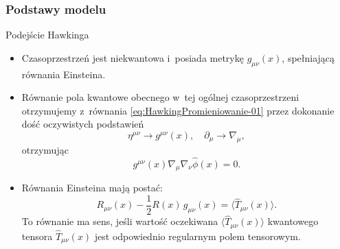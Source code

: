 \documentclass{beamer}  %
\begin{document}
\begin{frame}
  \frametitle{Podstawy modelu}

  \begin{block}{Podejście Hawkinga}
    \begin{itemize}
    \item Czasoprzestrzeń jest niekwantowa i~posiada metrykę
      $g_{ \mu \nu }( x )$, spełniającą równania Einsteina.
    \item Równanie pola kwantowe obecnego w~tej ogólnej
      czasoprzestrzeni otrzymujemy z~równania
      \eqref{eq:HawkingPromieniowanie-01} przez dokonanie dość
      oczywistych podstawień
      \begin{equation}
        \label{eq:HawkingPromieniowanie-02}
        \eta^{ \mu \nu } \to g^{ \mu \nu }( x ),
        \quad \partial_{ \mu } \to \nabla_{ \mu },
      \end{equation}
      otrzymując
      \begin{equation}
        \label{eq:HawkingPromieniowanie-03}
        g^{ \mu \nu }( x ) \nabla_{ \mu } \nabla_{ \nu }
        \widehat{ \phi }( x ) = 0.
      \end{equation}
    \item Równania Einsteina mają postać:
      \begin{equation}
        \label{eq:HawkingPromieniowanie-04}
        R_{ \mu \nu }( x ) - \frac{ 1 }{ 2 } R( x )\, g_{ \mu \nu }( x )
        = \langle \widehat{ T }_{ \mu \nu }( x ) \rangle.
      \end{equation}
      To równanie ma sens, jeśli wartość oczekiwana
      $\langle \widehat{ T }_{ \mu \nu }( x ) \rangle$ kwantowego
      tensora $\widehat{ T }_{ \mu \nu }( x )$ jest odpowiednio
      regularnym polem tensorowym.
    \end{itemize}
  \end{block}

\end{frame}
\end{document}
